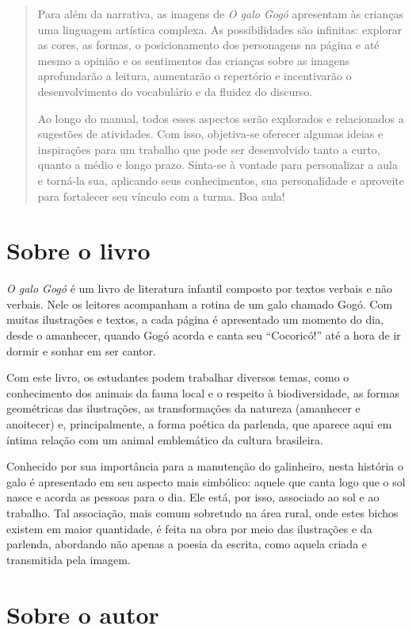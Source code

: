 \documentclass[11pt]{extarticle}
\begin{document}
\begin{abstract}
Para além da narrativa, as imagens de \textit{O galo Gogó} 
apresentam às crianças uma linguagem artística complexa.
As possibilidades são infinitas: explorar as cores, as formas, o posicionamento dos personagens na página e até mesmo a opinião e os sentimentos das crianças sobre as imagens 
aprofundarão a leitura, aumentarão o repertório e incentivarão o desenvolvimento do vocabulário e da fluidez do discurso.

Ao longo do manual, todos esses aspectos serão explorados e relacionados a sugestões de atividades. Com isso, objetiva-se oferecer algumas ideias e inspirações para um trabalho que pode ser desenvolvido tanto a curto, quanto a médio e longo prazo. Sinta-se à vontade para personalizar a aula e torná-la sua, aplicando seus conhecimentos, sua 
personalidade e aproveite para fortalecer seu vínculo com a turma.
Boa aula!

\end{abstract}

\section{Sobre o livro}
\textit{O galo Gogó} é um livro de literatura infantil composto por textos 
verbais e não verbais. Nele os leitores acompanham a rotina de um galo chamado
Gogó. Com muitas ilustrações e textos, a cada página é
apresentado um momento do dia, desde o amanhecer, quando
Gogó acorda e canta seu ``Cocoricó!'' até a hora de ir dormir e sonhar
em ser cantor. 

Com este livro, os estudantes podem
trabalhar diversos temas, como o conhecimento dos
animais da fauna local e o respeito à biodiversidade, as formas geométricas das ilustrações,
as transformações da natureza (amanhecer e anoitecer) e, principalmente, a forma poética da parlenda, que aparece aqui em íntima relação com um animal emblemático da cultura brasileira.

Conhecido por sua importância para a manutenção do galinheiro, nesta história
o galo é apresentado em seu aspecto mais simbólico: aquele que canta logo
que o sol nasce e acorda as pessoas para o dia. Ele está, por isso, associado
ao sol e ao trabalho. Tal associação, mais comum sobretudo na área rural, onde estes bichos
existem em maior quantidade, é feita na obra por meio das ilustrações e da parlenda, abordando não apenas a poesia da escrita, como aquela criada e transmitida pela imagem.


\section{Sobre o autor}
\end{document}
